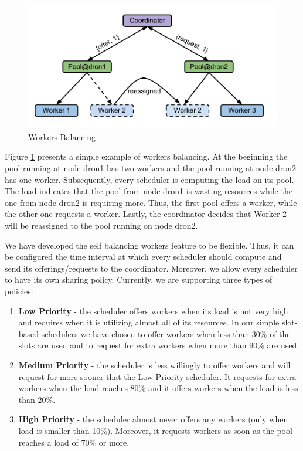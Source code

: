 \documentclass[11pt,a4paper,twoside]{report}
\begin{document}
\begin{figure}[h]
\centering
\includegraphics[scale=0.8]{DronWorkers}
\caption{Workers Balancing}
\label{fig:DronWorkers}
\end{figure}


Figure \ref{fig:DronWorkers} presents a simple example of workers balancing. At the beginning the pool running at node dron1 has two workers and the pool running at node dron2 has one worker. Subsequently, every scheduler is computing the load on its pool. The load indicates that the pool from node dron1 is wasting resources while the one from node dron2 is requiring more. Thus, the first pool offers a worker, while the other one requests a worker. Lastly, the coordinator decides that Worker 2 will be reassigned to the pool running on node dron2.


We have developed the self balancing workers feature to be flexible. Thus, it can be configured the time interval at which every scheduler should compute and send its offerings/requests to the coordinator. Moreover, we allow every scheduler to have its own sharing policy. Currently, we are supporting three types of policies:

\begin{enumerate}
\item{}
\textbf{Low Priority} - the scheduler offers workers when its load is not very high and requires when it is utilizing almost all of its resources. In our simple slot-based schedulers we have chosen to offer workers when less than 30\% of the slots are used and to request for extra workers when more than 90\% are used.
\item{}
\textbf{Medium Priority} - the scheduler is less willingly to offer workers and will request for more sooner that the Low Priority scheduler. It requests for extra workers when the load reaches 80\% and it offers workers when the load is less than 20\%.
\item{}
\textbf{High Priority} - the scheduler almost never offers any workers (only when load is smaller than 10\%). Moreover, it requests workers as soon as the pool reaches a load of 70\% or more.
\end{enumerate}
\end{document}
